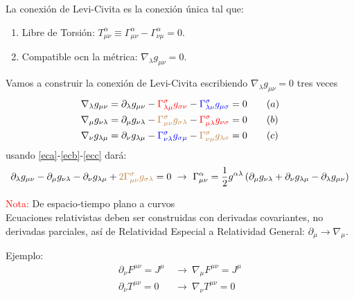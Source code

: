 \documentclass[../main]{subfiles}
\begin{document}
 La conexión de Levi-Civita es la conexión única tal que:
\begin{enumerate}
    \item Libre de Torsión: $T^{\alpha}_{\mu\nu}\equiv \Gamma^{\alpha}_{\mu\nu}-\Gamma^{\alpha}_{\nu\mu}=0$.
    \item Compatible ocn la métrica: $\nabla_{\lambda} g_{\mu\nu}=0$.
\end{enumerate}

Vamos a construir la conexión de Levi-Civita escribiendo $\nabla_{\lambda}g_{\mu\nu}=0$ tres veces 
\begin{align}
    \nabla_{\lambda}g_{\mu\nu}&=\partial_{\lambda}g_{\mu\nu}-\textcolor{red}{\Gamma^{\sigma}_{\lambda\mu}g_{\sigma\nu}}-\textcolor{blue}{\Gamma^{\sigma}_{\lambda\nu}g_{\mu\sigma}}=0 \tag{$a$} \label{eca}\\
    \nabla_{\mu}g_{\nu\lambda}&=\partial_{\mu}g_{\nu\lambda}-\textcolor{brown}{\Gamma^{\sigma}_{\mu\nu}g_{\sigma\lambda}}-\textcolor{red}{\Gamma^{\sigma}_{\mu\lambda}g_{\nu\sigma}}=0 \tag{$b$} \label{ecb}\\
    \nabla_{\nu}g_{\lambda\mu}&=\partial_{\nu}g_{\lambda\mu}-\textcolor{blue}{\Gamma^{\sigma}_{\nu\lambda}g_{\sigma\mu}}-\textcolor{brown}{\Gamma^{\sigma}_{\nu\mu}g_{\lambda\sigma}}=0 \tag{$c$} \label{ecc}
\end{align}
usando \eqref{eca}-\eqref{ecb}-\eqref{ecc} dará: 
\begin{equation}
    \partial_{\lambda}g_{\mu\nu}-\partial_{\mu}g_{\nu\lambda}-\partial_{\nu}g_{\lambda\mu}+\textcolor{brown}{2\Gamma^{\sigma}_{\mu\nu}g_{\sigma\lambda}}=0 \ \rightarrow \ \Gamma^{\alpha}_{\mu\nu}=\dfrac{1}{2}g^{\alpha\lambda}\left(\partial_{\mu} g_{\nu\lambda}+\partial_{\nu} g_{\lambda\mu}-\partial_{\lambda}g_{\mu\nu}\right) 
\end{equation}

\textcolor{red}{Nota:} De espacio-tiempo plano a curvos\\

Ecuaciones relativistas deben ser construidas con derivadas covariantes, no derivadas parciales, así de Relatividad Especial a Relatividad General: $\partial_{\mu} \rightarrow \nabla_{\mu}$.

Ejemplo:
\begin{equation}
    \begin{split}
        \partial_{\nu} F^{\mu\nu}=J^{\mu} \ &\rightarrow \ \nabla_{\mu}F^{\mu\nu}=J^{\mu}\\
        \partial_{\nu} T^{\mu\nu}=0 \ &\rightarrow \ \nabla_{\nu} T^{\mu\nu}=0
    \end{split}
\end{equation}
\end{document}
